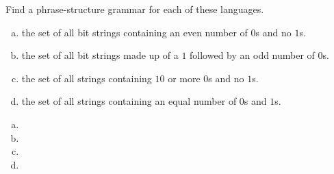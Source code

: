 \documentclass[../main.tex]{subfiles}
\begin{document}
Find a phrase-structure grammar for each of these languages.
\begin{enumerate}[a)]
	\item the set of all bit strings containing an even number of $0$s and no $1$s.
	\item the set of all bit strings made up of a $1$ followed by an odd number of $0$s.
	\setcounter{enumi}{3}
	\item the set of all strings containing $10$ or more $0$s and no $1$s.
	\setcounter{enumi}{5}
	\item the set of all strings containing an equal number of $0$s and $1$s.
\end{enumerate}

\solution
\begin{enumerate}[a)]
	\item 
	\item 
	\setcounter{enumi}{3}
	\item 
	\setcounter{enumi}{5}
	\item 
\end{enumerate}
\end{document}
